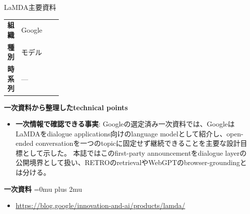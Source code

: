 \begin{technicalnote}{LaMDA}{主要資料}
\begingroup
\begin{tabularx}{\linewidth}{@{}>{\bfseries}p{0.22\linewidth}X@{}}
組織 & Google \\
種別 & モデル \\
時系列 & — \\
\end{tabularx}
\smallskip
{\bfseries 一次資料から整理したtechnical points}
\begin{itemize}[leftmargin=1.5em,itemsep=0.35em]
\item \textbf{一次情報で確認できる事実}: Googleの選定済み一次資料では、GoogleはLaMDAをdialogue applications向けのlanguage modelとして紹介し、open-ended conversationを一つのtopicに固定せず継続できることを主要な設計目標として示した。 本誌ではこのfirst-party announcementをdialogue layerの公開境界として扱い、RETROのretrievalやWebGPTのbrowser-groundingとは分ける。
\end{itemize}
\begin{minipage}{\linewidth}
\begin{samepage}
{\bfseries 一次資料}
\begingroup\sloppy
\Urlmuskip=0mu plus 2mu\relax
\begin{itemize}[leftmargin=1.5em,itemsep=0.25em]
\item {\scriptsize\url{https://blog.google/innovation-and-ai/products/lamda/}}
\end{itemize}
\endgroup
\end{samepage}
\end{minipage}
\endgroup
\end{technicalnote}
\medskip


